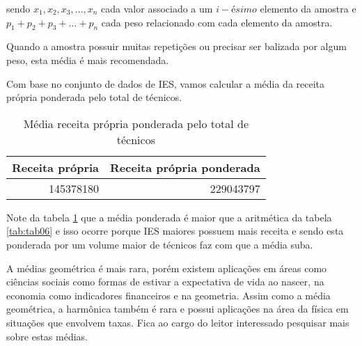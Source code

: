 \documentclass[12pt,]{style/krantz}
\makeatletter
\newenvironment{Shaded}{\begin{snugshade}}{\end{snugshade}}
\newcommand{\DataTypeTok}[1]{\textcolor[rgb]{0.13,0.29,0.53}{#1}}
\newcommand{\KeywordTok}[1]{\textcolor[rgb]{0.13,0.29,0.53}{\textbf{#1}}}
\newcommand{\NormalTok}[1]{#1}
\newcommand{\OperatorTok}[1]{\textcolor[rgb]{0.81,0.36,0.00}{\textbf{#1}}}
\newcommand{\StringTok}[1]{\textcolor[rgb]{0.31,0.60,0.02}{#1}}
\renewenvironment{quote}{\begin{VF}}{\end{VF}}
\newenvironment{kframe}{%
\medskip{}
\setlength{\fboxsep}{.8em}
 \def\at@end@of@kframe{}%
 \ifinner\ifhmode%
  \def\at@end@of@kframe{\end{minipage}}%
  \begin{minipage}{\columnwidth}%
 \fi\fi%
 \def\FrameCommand##1{\hskip\@totalleftmargin \hskip-\fboxsep
 \colorbox{shadecolor}{##1}\hskip-\fboxsep
     \hskip-\linewidth \hskip-\@totalleftmargin \hskip\columnwidth}%
 \MakeFramed {\advance\hsize-\width
   \@totalleftmargin\z@ \linewidth\hsize
   \@setminipage}}%
 {\par\unskip\endMakeFramed%
 \at@end@of@kframe}
\renewenvironment{Shaded}{\begin{kframe}}{\end{kframe}}
\theoremstyle{definition}
\theoremstyle{definition}
\theoremstyle{definition}
\theoremstyle{remark}
\let\BeginKnitrBlock\begin \let\EndKnitrBlock\end
\makeatother
\begin{document}
sendo \(x_1, x_2, x_3, \dots , x_n\) cada valor associado a um \(i-ésimo\) elemento da amostra e \(p_1 + p_2 + p_3 + \dots + p_n\) cada peso relacionado com cada elemento da amostra.

\begin{quote}
Quando a amostra possuir muitas repetições ou precisar ser balizada por algum peso, esta média é mais recomendada.
\end{quote}

\BeginKnitrBlock{example}
\protect\hypertarget{exm:unnamed-chunk-39}{}{\label{exm:unnamed-chunk-39} }Com base no conjunto de dados de IES, vamos calcular a média da receita própria ponderada pelo total de técnicos.
\EndKnitrBlock{example}

\begin{Shaded}
\end{Shaded}

\begin{table}[!h]

\caption{\label{tab:tab07}Média receita própria ponderada pelo total de técnicos}
\centering
\begin{tabular}{r|r}
\hline
Receita própria & Receita própria ponderada\\
\hline
145378180 & 229043797\\
\hline
\end{tabular}
\end{table}

Note da tabela \ref{tab:tab07} que a média ponderada é maior que a aritmética da tabela \ref{tab:tab06} e isso ocorre porque IES maiores possuem mais receita e sendo esta ponderada por um volume maior de técnicos faz com que a média suba.

A médias geométrica é mais rara, porém existem aplicações em áreas como ciências sociais como formas de estivar a expectativa de vida ao nascer, na economia como indicadores financeiros e na geometria. Assim como a média geométrica, a harmônica também é rara e possui aplicações na área da física em situações que envolvem taxas. Fica ao cargo do leitor interessado pesquisar mais sobre estas médias.
\end{document}
